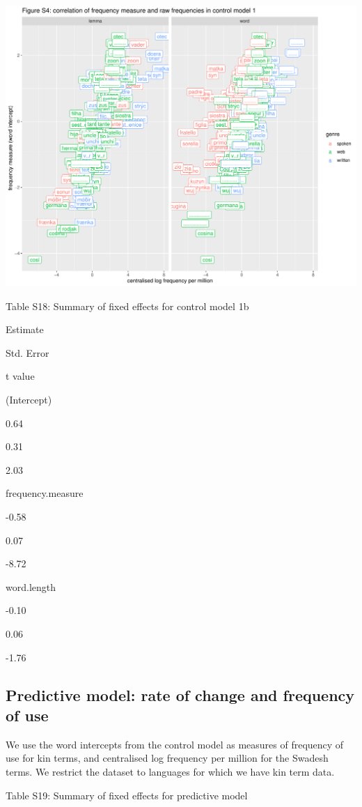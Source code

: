 \documentclass[]{article}
\begin{document}
\includegraphics{figures/unnamed-chunk-10-1.pdf}

Table S18: Summary of fixed effects for control model 1b

Estimate

Std. Error

t value

(Intercept)

0.64

0.31

2.03

frequency.measure

-0.58

0.07

-8.72

word.length

-0.10

0.06

-1.76

\hypertarget{predictive-model-rate-of-change-and-frequency-of-use}{%
\subsection{Predictive model: rate of change and frequency of
use}\label{predictive-model-rate-of-change-and-frequency-of-use}}

We use the word intercepts from the control model as measures of
frequency of use for kin terms, and centralised log frequency per
million for the Swadesh terms. We restrict the dataset to languages for
which we have kin term data.

Table S19: Summary of fixed effects for predictive model
\end{document}
